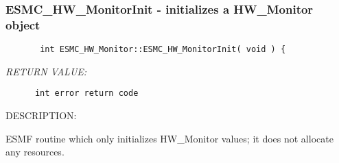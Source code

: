  
\parskip        0pt
\parindent      0pt
\baselineskip  11pt
 
\def\bv{\begin{verbatim}}
\def\ev{\end{verbatim}}
\def\be{\begin{equation}}
\def\ee{\end{equation}}
\def\bea{\begin{eqnarray}}
\def\eea{\end{eqnarray}}
\def\bi{\begin{itemize}}
\def\ei{\end{itemize}}
\def\bn{\begin{enumerate}}
\def\en{\end{enumerate}}
\def\bd{\begin{description}}
\def\ed{\end{description}}
\def\({\left (}
\def\){\right )}
\def\[{\left [}
\def\]{\right ]}
\def\<{\left  \langle}
\def\>{\right \rangle}
\def\cI{{\cal I}}
\def\diag{\mathop{\rm diag}}
\def\tr{\mathop{\rm tr}}


 
\subsubsection{ESMC\_HW\_MonitorInit - initializes a HW\_Monitor object}


  
\begin{verbatim}       int ESMC_HW_Monitor::ESMC_HW_MonitorInit( void ) {\end{verbatim}{\em RETURN VALUE:}
\begin{verbatim}      int error return code\end{verbatim}
{\sf DESCRIPTION:\\ }


        ESMF routine which only initializes HW_Monitor values; it does not
        allocate any resources.
   
